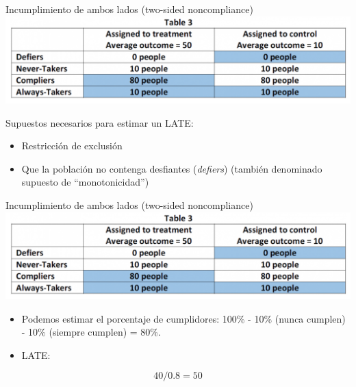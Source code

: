 \documentclass[
  ignorenonframetext,
]{beamer}
\providecommand{\tightlist}{%
  \setlength{\itemsep}{0pt}\setlength{\parskip}{0pt}}
\begin{document}
\begin{frame}{Incumplimiento de ambos lados (two-sided noncompliance)}
\protect\hypertarget{incumplimiento-de-ambos-lados-two-sided-noncompliance}{}
\includegraphics[width=1\textwidth,height=\textheight]{figs/compliers2}

Supuestos necesarios para estimar un LATE:

\begin{itemize}
\tightlist
\item
  Restricción de exclusión \pause
\item
  Que la población no contenga desfiantes (\emph{defiers}) (también
  denominado supuesto de ``monotonicidad'')
\end{itemize}
\end{frame}

\begin{frame}{Incumplimiento de ambos lados (two-sided noncompliance)}
\protect\hypertarget{incumplimiento-de-ambos-lados-two-sided-noncompliance-1}{}
\includegraphics[width=1\textwidth,height=\textheight]{figs/compliers2}

\begin{itemize}
\item
  Podemos estimar el porcentaje de cumplidores: 100\% - 10\% (nunca
  cumplen) - 10\% (siempre cumplen) = 80\%.
\item
  LATE:
\end{itemize}

\[40/0.8 = 50\]
\end{frame}
\end{document}
